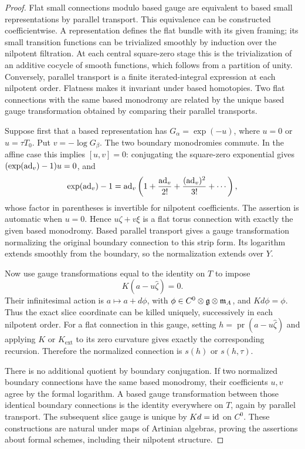 \begin{proof}
Flat small connections modulo based gauge are equivalent to based
small representations by parallel transport.  This equivalence can
be constructed coefficientwise.  A representation defines the flat
bundle with its given framing; its small transition functions can be
trivialized smoothly by induction over the nilpotent filtration.
At each central square-zero stage this is the trivialization of an
additive cocycle of smooth functions, which follows from a partition
of unity.  Conversely, parallel transport is a finite iterated-integral
expression at each nilpotent order.  Flatness makes it invariant under
based homotopies.  Two flat connections with the same based monodromy
are related by the unique based gauge transformation obtained by
comparing their parallel transports.

Suppose first that a based representation has
$G_\alpha=\exp(-u)$, where $u=0$ or $u=\tau T_0$.  Put
$v=-\log G_\beta$.  The two boundary monodromies commute.  In the
affine case this implies $[u,v]=0$: conjugating the square-zero
exponential gives $(\exp(\operatorname{ad}_v)-1)u=0$, and
\[
 \exp(\operatorname{ad}_v)-1
    =\operatorname{ad}_v\left(1+\frac{\operatorname{ad}_v}{2!}
                   +\frac{(\operatorname{ad}_v)^2}{3!}+\cdots\right),
\]
whose factor in parentheses is invertible for nilpotent coefficients.
The assertion is automatic when $u=0$.  Hence
$u\zeta+v\xi$ is a flat torus connection with exactly the given based
monodromy.  Based parallel transport gives a gauge transformation
normalizing the original boundary connection to this strip form.
Its logarithm extends smoothly from the boundary, so the normalization
extends over $Y$.

Now use gauge transformations equal to the identity on $T$ to impose
\[
 K(a-u\widehat\zeta)=0.
\]
Their infinitesimal action is $a\mapsto a+d\phi$, with
$\phi\in C^0\otimes\mathfrak{g}\otimes\mathfrak{m}_A$, and $Kd\phi=\phi$.
Thus the exact slice coordinate can be killed uniquely, successively
in each nilpotent order.  For a flat connection in this gauge, setting
$h=\operatorname{pr}(a-u\widehat\zeta)$ and applying $K$ or
$K_{\mathrm{ext}}$ to its zero curvature gives exactly the corresponding
recursion.  Therefore the normalized connection is $s(h)$ or
$s(h,\tau)$.

There is no additional quotient by boundary conjugation.  If two
normalized boundary connections have the same based monodromy, their
coefficients $u,v$ agree by the formal logarithm.  A based gauge
transformation between those identical boundary connections is the
identity everywhere on $T$, again by parallel transport.  The subsequent
slice gauge is unique by $Kd=\operatorname{id}$ on $C^0$.  These constructions are
natural under maps of Artinian algebras, proving the assertions about
formal schemes, including their nilpotent structure.
\end{proof}

